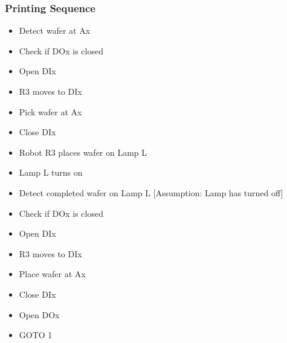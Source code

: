 \documentclass[a4paper,12pt]{article}
\begin{document}
\subsubsection {Printing Sequence}
\begin{itemize}
\item Detect wafer at Ax
\item Check if DOx is closed
\item Open DIx
\item R3 moves to DIx
\item Pick wafer at Ax
\item Close DIx
\item Robot R3 places wafer on Lamp L
\item Lamp L turns on
\item Detect completed wafer on Lamp L [Assumption: Lamp has turned off]
\item Check if DOx is closed
\item Open DIx
\item R3 moves to DIx
\item Place wafer at Ax
\item Close DIx
\item Open DOx
\item GOTO 1
\end{itemize}
\end{document}
